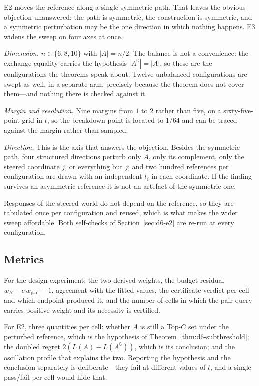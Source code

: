 E2 moves the reference along a single symmetric path. That leaves the obvious objection
unanswered: the path is symmetric, the construction is symmetric, and a symmetric
perturbation may be the one direction in which nothing happens. E3 widens the sweep on four
axes at once.

\emph{Dimension.} $n\in\{6,8,10\}$ with $|A|=n/2$. The balance is not a convenience: the
exchange equality carries the hypothesis $|A^{\complement}|=|A|$, so these are the
configurations the theorems speak about. Twelve unbalanced configurations are swept as well,
in a separate arm, precisely because the theorem does not cover them---and nothing there is
checked against it.

\emph{Margin and resolution.} Nine margins from $1$ to $2$ rather than five, on a
sixty-five-point grid in $t$, so the breakdown point is located to $1/64$ and can be traced
against the margin rather than sampled.

\emph{Direction.} This is the axis that answers the objection. Besides the symmetric path,
four structured directions perturb only $A$, only its complement, only the steered coordinate
$j$, or everything but $j$; and two hundred references per configuration are drawn with an
independent $t_{i}$ in each coordinate. If the finding survives an asymmetric reference it is
not an artefact of the symmetric one.

Responses of the steered world do not depend on the reference, so they are tabulated once per
configuration and reused, which is what makes the wider sweep affordable. Both self-checks of
Section~\ref{sec:d6-e2} are re-run at every configuration.

\subsection{Metrics}

For the design experiment: the two derived weights, the budget residual
$w_{B}+c\,w_{\mathrm{pair}}-1$, agreement with the fitted values, the certificate verdict per
cell and which endpoint produced it, and the number of cells in which the pair query carries
positive weight and its necessity is certified.

For E2, three quantities per cell: whether $A$ is still a Top-$C$ set under the perturbed
reference, which is the hypothesis of Theorem~\ref{thm:d6-subthreshold}; the doubled regret
$2(L(A)-L(A^{\complement}))$, which is its conclusion; and the oscillation profile that
explains the two. Reporting the hypothesis and the conclusion separately is deliberate---they
fail at different values of $t$, and a single pass/fail per cell would hide that.

